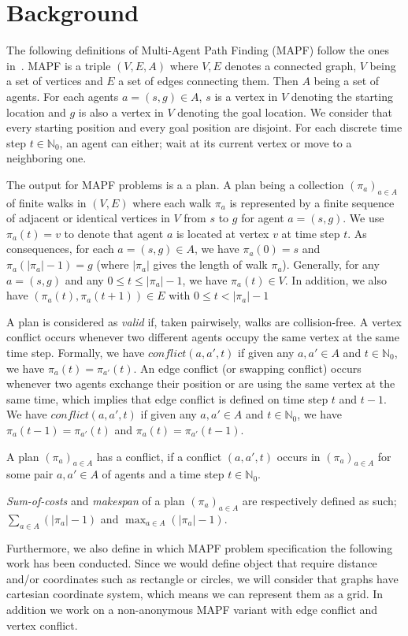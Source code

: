 \section{Background}\label{sec:background}

The following definitions of Multi-Agent Path Finding (MAPF) follow the ones in~\cite{husvobbass22a}. MAPF is a triple $(V,E,A)$ where \(V,E\) denotes a connected graph, \(V\) being a set of vertices and \(E\) a set of edges connecting them. Then \(A\) being a set of agents. For each agents \(a=(s,g) \in A\), \(s\) is a vertex in \(V\) denoting the starting location and \(g\) is also a vertex in \(V\) denoting the goal location. We consider that every starting position and every goal position are disjoint.
For each discrete time step \(t\in \mathbb{N}_0\), an agent can either; wait at its current vertex or move to a neighboring one.

The output for MAPF problems is a a plan. A plan being a collection $(\pi_a)_{a\in A}$ of finite walks in $(V,E)$ where each walk $\pi_a$ is represented by a finite sequence of adjacent or identical vertices in $V$ from $s$ to $g$ for agent $a = (s,g)$. We use \(\pi_a (t) = v\) to denote that agent \(a\) is located at vertex \(v\) at time step \(t\). 
As consequences, for each \(a=(s,g) \in A\), we have $\pi_a(0) = s$ and  $\pi_a(|\pi_a|-1) = g$ (where $|\pi_a|$ gives the length of walk $\pi_a$). Generally, for any \(a=(s,g)\) and any $0 \leq t \leq |\pi_a|-1$, we have \(\pi_a(t) \in V\). In addition, we also have $(\pi_a(t),\pi_a(t+1))\in E$ with $0 \leq t < |\pi_a|-1$

A plan is considered as \textit{valid} if, taken pairwisely, walks are collision-free. A vertex conflict occurs whenever two different agents occupy the same vertex at the same time step. Formally, we have \(conflict(a,a',t)\) if given any $a,a'\in A$  and $t\in\mathbb{N}_0$, we have $\pi_a(t) = \pi_{a'}(t)$. An edge conflict (or swapping conflict) occurs whenever two agents exchange their position or are using the same vertex at the same time, which implies that edge conflict is defined on time step \(t\) and \(t-1\). We have \(conflict(a,a',t)\) if given any $a,a'\in A$  and $t\in\mathbb{N}_0$, we have $\pi_a(t-1) = \pi_{a'}(t)$ and $\pi_a(t) = \pi_{a'}(t-1)$.

A plan $(\pi_a)_{a\in A}$ has a conflict, if a conflict $(a, a',t)$ occurs in $(\pi_a)_{a\in A}$ for some pair $a,a'\in A$ of agents and a time step $t\in\mathbb{N}_0$.

\textit{Sum-of-costs} and \textit{makespan} of a plan $(\pi_a)_{a\in A}$ are respectively defined as such; $\sum_{a\in A} (|\pi_a| - 1)$ and $\max_{a\in A} (|\pi_a| - 1)$.


Furthermore, we also define in which MAPF problem specification the following work has been conducted. Since we would define object that require distance and/or coordinates such as rectangle or circles, we will consider that graphs have cartesian coordinate system, which means we can represent them as a grid. In addition we work on a non-anonymous MAPF variant with edge conflict and vertex conflict. 




